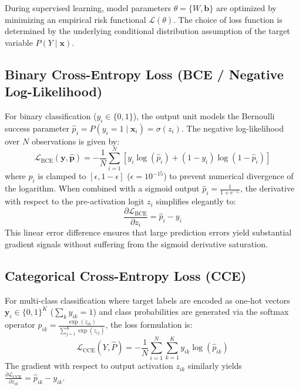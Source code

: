 \documentclass[12pt]{article}
\begin{document}
During supervised learning, model parameters $\theta = \{W, \mathbf{b}\}$ are optimized by minimizing an empirical risk functional $\mathcal{L}(\theta)$. The choice of loss function is determined by the underlying conditional distribution assumption of the target variable $P(Y \mid \mathbf{x})$.

\subsection{Binary Cross-Entropy Loss (BCE / Negative Log-Likelihood)}
For binary classification ($y_i \in \{0, 1\}$), the output unit models the Bernoulli success parameter $\hat{p}_i = P(y_i = 1 \mid \mathbf{x}_i) = \sigma(z_i)$. The negative log-likelihood over $N$ observations is given by:
\begin{equation}
\mathcal{L}_{\text{BCE}}(\mathbf{y}, \hat{\mathbf{p}}) = -\frac{1}{N} \sum_{i=1}^N \left[ y_i \log(\hat{p}_i) + (1 - y_i) \log(1 - \hat{p}_i) \right]
\end{equation}
where $\hat{p}_i$ is clamped to $[\epsilon, 1 - \epsilon]$ ($\epsilon = 10^{-15}$) to prevent numerical divergence of the logarithm. When combined with a sigmoid output $\hat{p}_i = \frac{1}{1 + e^{-z_i}}$, the derivative with respect to the pre-activation logit $z_i$ simplifies elegantly to:
\begin{equation}
\frac{\partial \mathcal{L}_{\text{BCE}}}{\partial z_i} = \hat{p}_i - y_i
\end{equation}
This linear error difference ensures that large prediction errors yield substantial gradient signals without suffering from the sigmoid derivative saturation.

\subsection{Categorical Cross-Entropy Loss (CCE)}
For multi-class classification where target labels are encoded as one-hot vectors $\mathbf{y}_i \in \{0, 1\}^K$ ($\sum_k y_{ik} = 1$) and class probabilities are generated via the softmax operator $\hat{p}_{ik} = \frac{\exp(z_{ik})}{\sum_{j=1}^K \exp(z_{ij})}$, the loss formulation is:
\begin{equation}
\mathcal{L}_{\text{CCE}}(Y, \hat{P}) = -\frac{1}{N} \sum_{i=1}^N \sum_{k=1}^K y_{ik} \log(\hat{p}_{ik})
\end{equation}
The gradient with respect to output activation $z_{ik}$ similarly yields $\frac{\partial \mathcal{L}_{\text{CCE}}}{\partial z_{ik}} = \hat{p}_{ik} - y_{ik}$.
\end{document}
